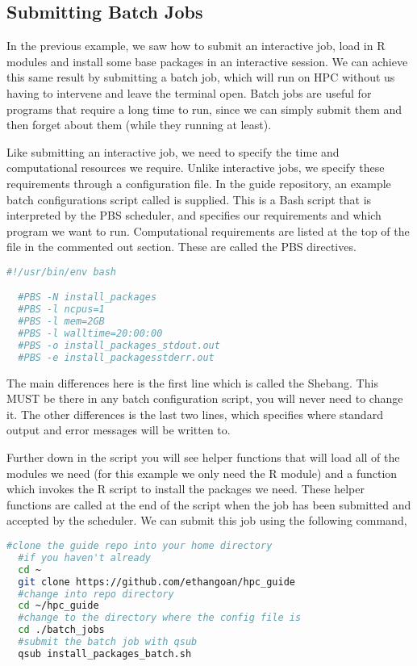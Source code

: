 \subsection{Submitting Batch Jobs}
In the previous example, we saw how to submit an interactive job, load in R modules and install some base packages in an interactive session. We can achieve this same result by submitting a batch job, which will run on HPC without us having to intervene and leave the terminal open. Batch jobs are useful for programs that require a long time to run, since we can simply submit them and then forget about them (while they running at least).
%
\par
% 
%
Like submitting an interactive job, we need to specify the time and computational resources we require. Unlike interactive jobs, we specify these requirements through a configuration file. In the guide repository, an example batch configurations script called  is supplied. This is a Bash script that is interpreted by the PBS scheduler, and specifies our requirements and which program we want to run. Computational requirements are listed at the top of the file in the commented out section. These are called the PBS directives.
\begin{lstlisting}[language=bash, frame=single]
  #!/usr/bin/env bash

  #PBS -N install_packages
  #PBS -l ncpus=1
  #PBS -l mem=2GB
  #PBS -l walltime=20:00:00
  #PBS -o install_packages_stdout.out
  #PBS -e install_packagesstderr.out

\end{lstlisting}
%
%
The main differences here is the first line which is called the Shebang. This MUST be there in any batch configuration script, you will never need to change it. The other differences is the last two lines, which specifies where standard output and error messages will be written to.
%
%
\par
%
%
Further down in the script you will see helper functions that will load all of the modules we need (for this example we only need the R module) and a function which invokes the R script to install the packages we need. These helper functions are called at the end of the script when the job has been submitted and accepted by the scheduler. We can submit this job using the following command,
%
%
\newpage
\begin{lstlisting}[language=bash, frame=single]
  #clone the guide repo into your home directory
  #if you haven't already
  cd ~
  git clone https://github.com/ethangoan/hpc_guide
  #change into repo directory
  cd ~/hpc_guide
  #change to the directory where the config file is
  cd ./batch_jobs
  #submit the batch job with qsub
  qsub install_packages_batch.sh
\end{lstlisting}
